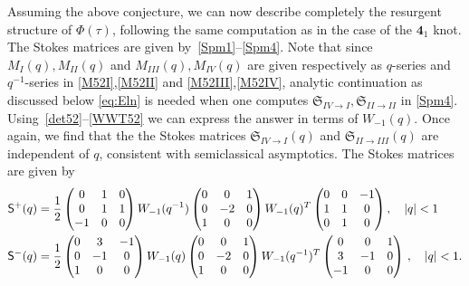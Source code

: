 \documentclass[12pt,reqno]{amsart}
\theoremstyle{definition}
\def\md{\mathbf}
\def\mfS{\mathfrak{S}}
\def\ms{\mathsf}
\newcommand{\knot}[1]{\md{#1}}
\begin{document}
Assuming the above conjecture, we can now describe completely the
resurgent structure of $\Phi(\tau)$, following the same computation as
in the case of the $\knot{4}_1$ knot. The Stokes matrices are given
by~\eqref{Spm1}--\eqref{Spm4}.
Note that since $M_I(q), M_{II}(q)$ and
$M_{III}(q), M_{IV}(q)$ are given respectively as $q$-series and
$q^{-1}$-series in \eqref{M52I},\eqref{M52II} and
\eqref{M52III},\eqref{M52IV}, analytic continuation as discussed below
\eqref{eq:Eln} is needed when one computes
$\mfS_{IV\rightarrow I},\mfS_{II\rightarrow II}$ in \eqref{Spm4}.
Using~\eqref{det52}--\eqref{WWT52} we
can express the answer in terms of $W_{-1}(q)$. Once again, we find
that the the Stokes matrices $\mfS_{IV\rightarrow I}(q)$ and
$\mfS_{II\rightarrow III}(q)$ are independent of $q$, consistent with
semiclassical asymptotics. The Stokes matrices are given by
\begin{subequations}
\begin{align}
  \label{S52p}
  \ms{S}^+(q)
  &={1\over 2}
    \begin{pmatrix}
      0&1&0\\
      0&1&1\\
      -1&0&0
    \end{pmatrix}W_{-1}(q^{-1})
            \begin{pmatrix}
              0&0&1\\
              0&-2&0\\
              1&0&0
            \end{pmatrix} W_{-1}(q)^T
                   \begin{pmatrix}
                     0&0&-1\\
                     1&1&0\\
                     0&1&0
                   \end{pmatrix},\quad |q|<1\\
  \label{S52m}
  \ms{S}^-(q)
  &= {1\over 2}
    \begin{pmatrix}
      0&3&-1\\
      0&-1&0\\
      1&0&0
    \end{pmatrix} W_{-1}(q)
           \begin{pmatrix}
             0&0&1\\
             0&-2&0\\
             1&0&0
           \end{pmatrix}W_{-1}(q^{-1})^T
                  \begin{pmatrix}
                    0&0&1\\
                    3&-1&0\\
                    -1&0&0
                  \end{pmatrix} \,,\quad |q|<1.
\end{align}
\end{subequations}
\end{document}
